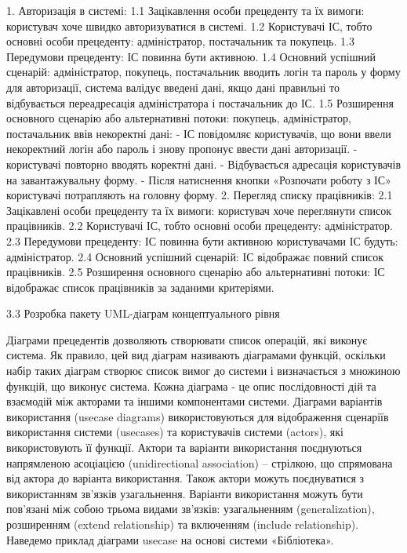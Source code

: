1.	Авторизація в системі: 
1.1 Зацікавлення особи прецеденту та їх вимоги: користувач хоче швидко авторизуватися в системі. 
1.2	Користувачі ІС, тобто основні особи прецеденту: адміністратор, постачальник та покупець. 
	    1.3 Передумови прецеденту: ІС повинна бути активною. 
             1.4 Основний успішний сценарій: адміністратор, покупець, постачальник вводить логін та пароль у форму для авторизації, система валідує введені дані, якщо дані правильні то відбувається переадресація адміністратора і постачальник до ІС. 
	    1.5 Розширення основного сценарію або альтернативні потоки: покупець, адміністратор, постачальник ввів некоректні дані: - ІС повідомляє користувачів, що вони ввели некоректний логін або пароль і знову пропонує ввести дані авторизації. - користувачі повторно вводять коректні дані. - Відбувається адресація користувачів на завантажувальну форму. - Після натиснення кнопки «Розпочати роботу з ІС» користувачі потрапляють на головну форму. 
	2. Перегляд списку працівників: 
	     2.1 Зацікавлені особи прецеденту та їх вимоги: користувач хоче переглянути список працівників. 
	     2.2 Користувачі ІС, тобто основні особи прецеденту: адміністратор. 
	     2.3 Передумови прецеденту: ІС повинна бути активною користувачами ІС будуть: адміністратор. 
	     2.4 Основний успішний сценарій: ІС відображає повний список працівників. 
2.5 Розширення основного сценарію або альтернативні потоки: ІС відображає список працівників за заданими критеріями. 

	3.3 Розробка пакету UML-діаграм концептуального рівня 

Діаграми прецедентів  дозволяють створювати список операцій, які виконує система. Як правило, цей вид діаграм називають діаграмами функцій, оскільки набір таких діаграм створює список вимог до системи і визначається з множиною функцій, що виконує система. Кожна діаграма - це опис послідовності дій та взаємодій між акторами та іншими компонентами системи. Діаграми варіантів використання (usecase diagrams) використовуються для відображення сценаріїв використання системи (usecases) та користувачів системи (actors), які використовують її функції. Актори та варіанти використання поєднуються напрямленою асоціацією (unidirectional association) – стрілкою, що спрямована від актора до варіанта використання. Також актори можуть поєднуватися з використанням зв’язків узагальнення. Варіанти використання можуть бути пов’язані між собою трьома видами зв’язків: узагальненням (generalization), розширенням (extend relationship) та включенням (include relationship). Наведемо приклад діаграми usecase на основі системи «Бібліотека».

